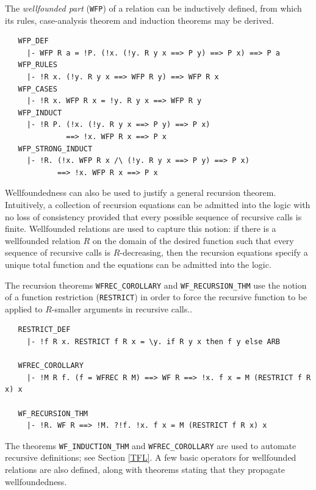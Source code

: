 The \emph{wellfounded part} ({\small\verb+WFP+}) of a relation can be
inductively defined, from which its rules, case-analysis theorem and
induction theorems may be derived.
%
\begin{hol}
\begin{verbatim}
   WFP_DEF
     |- WFP R a = !P. (!x. (!y. R y x ==> P y) ==> P x) ==> P a
   WFP_RULES
     |- !R x. (!y. R y x ==> WFP R y) ==> WFP R x
   WFP_CASES
     |- !R x. WFP R x = !y. R y x ==> WFP R y
   WFP_INDUCT
     |- !R P. (!x. (!y. R y x ==> P y) ==> P x)
              ==> !x. WFP R x ==> P x
   WFP_STRONG_INDUCT
     |- !R. (!x. WFP R x /\ (!y. R y x ==> P y) ==> P x)
            ==> !x. WFP R x ==> P x
\end{verbatim}
\end{hol}

Wellfoundedness can also be used to justify a general recursion
theorem. Intuitively, a collection of recursion equations can be
admitted into the \HOL{} logic with no loss of consistency provided
that every possible sequence of recursive calls is finite. Wellfounded
relations are used to capture this notion: if there is a wellfounded
relation $R$ on the domain of the desired function such that every
sequence of recursive calls is $R$-decreasing, then the recursion
equations specify a unique total function and the equations can be
admitted into the logic.

The recursion theorems {\small\verb+WFREC_COROLLARY+} and
{\small\verb+WF_RECURSION_THM+} use the notion of a function
restriction ({\small\verb+RESTRICT+}) in order to force the recursive
function to be applied to $R$-smaller arguments in recursive calls..
%
\begin{hol}
\begin{verbatim}
   RESTRICT_DEF
     |- !f R x. RESTRICT f R x = \y. if R y x then f y else ARB

   WFREC_COROLLARY
     |- !M R f. (f = WFREC R M) ==> WF R ==> !x. f x = M (RESTRICT f R x) x

   WF_RECURSION_THM
     |- !R. WF R ==> !M. ?!f. !x. f x = M (RESTRICT f R x) x
\end{verbatim}
\end{hol}

\noindent The theorems {\small\verb+WF_INDUCTION_THM+} and
{\small\verb+WFREC_COROLLARY+} are used to automate recursive
definitions; see Section \ref{TFL}. A few basic operators for
wellfounded relations are also defined, along with theorems stating
that they propagate wellfoundedness.

